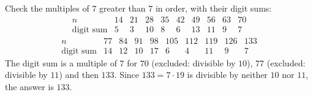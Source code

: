 Check the multiples of $7$ greater than $7$ in order, with their digit sums:
\[
\begin{array}{c|ccccccccc}
n&14&21&28&35&42&49&56&63&70\\ \hline
\text{digit sum}&5&3&10&8&6&13&11&9&7
\end{array}
\]
\[
\begin{array}{c|ccccccccc}
n&77&84&91&98&105&112&119&126&133\\ \hline
\text{digit sum}&14&12&10&17&6&4&11&9&7
\end{array}
\]
The digit sum is a multiple of $7$ for $70$ (excluded: divisible by $10$), $77$ (excluded: divisible by $11$) and then $133$. Since $133=7\cdot19$ is divisible by neither $10$ nor $11$, the answer is $\boxed{133}$.

